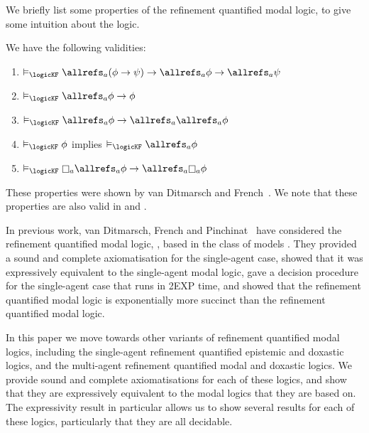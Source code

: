 We briefly list some properties of the refinement quantified modal logic, to
give some intuition about the logic. 
\pagebreak
\begin{proposition}
We have the following validities: 
\begin{enumerate}
\item $\entails_{\logicKF} \allrefs_a (\phi \implies \psi) \implies \allrefs_a
\phi \implies \allrefs_a \psi$
\item $\entails_{\logicKF} \allrefs_a \phi \implies \phi$
\item $\entails_{\logicKF} \allrefs_a \phi \implies \allrefs_a \allrefs_a \phi$
\item $\entails_{\logicKF} \phi$ implies $\entails_{\logicKF} \allrefs_a \phi$
\item $\entails_{\logicKF} \knows_a \allrefs_a \phi \implies \allrefs_a \knows_a
\phi$
\end{enumerate}
\end{proposition}

These properties were shown by van Ditmarsch and
French~\cite{french2009simulation}. We note that these properties are also valid
in \logicSF{} and \logicKDF{}.

In previous work, van Ditmarsch, French and Pinchinat~\cite{french2010future}
have considered the refinement quantified modal logic, \logicKF{}, based in the
class of models \classK{}. They provided a sound and complete axiomatisation for
the single-agent case, showed that it was expressively equivalent to the
single-agent modal logic, gave a decision procedure for the single-agent case
that runs in 2EXP time, and showed that the refinement quantified modal logic is
exponentially more succinct than the refinement quantified modal logic.

In this paper we move towards other variants of refinement quantified modal
logics, including the single-agent refinement quantified epistemic and doxastic
logics, and the multi-agent refinement quantified modal and doxastic logics. We
provide sound and complete axiomatisations for each of these logics, and show
that they are expressively equivalent to the modal logics that they are based
on. The expressivity result in particular allows us to show several results for
each of these logics, particularly that they are all decidable.
